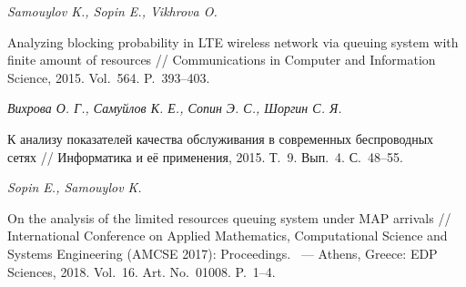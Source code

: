 \documentclass[a4paper,12pt]{article}
\begin{document}
\begin{enumerate}


\textit{Samouylov K., Sopin E., Vikhrova O.}

Analyzing blocking probability in LTE wireless network via queuing system with finite amount of resources // {Communications in Computer and Information Science}, 2015. Vol.~564. P.~393--403.





\textit{Вихрова О. Г., Самуйлов К. Е., Сопин Э. С., Шоргин С. Я.}

К анализу показателей качества обслуживания в современных беспроводных сетях // {Информатика и её применения}, 2015. Т.~9. Вып.~4. С.~48--55.





\textit{Sopin E., Samouylov K.}

On the analysis of the limited resources queuing system under MAP arrivals // {International Conference on Applied Mathematics, Computational Science and Systems Engineering (AMCSE 2017): Proceedings}. ~--- Athens, Greece: EDP Sciences, 2018. Vol.~16. Art. No.~01008. P.~1--4.






\end{enumerate}
\end{document}
